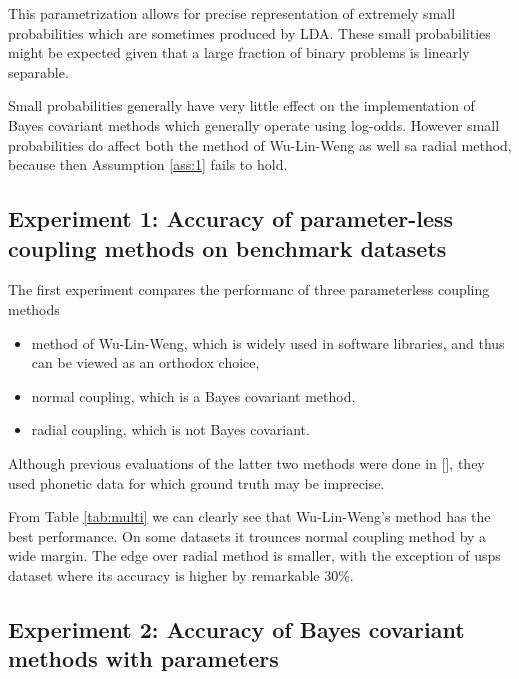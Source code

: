 \documentclass[twoside,11pt]{article}
\begin{document}
This parametrization allows for precise representation of extremely small probabilities which are sometimes produced by LDA. These small probabilities might be expected given that a large fraction of binary problems is linearly separable. 

Small probabilities generally have very little effect on the implementation of Bayes covariant methods which generally operate using log-odds. However small probabilities do affect both the method of Wu-Lin-Weng as well sa radial method, because then Assumption \ref{ass:1} fails to hold. 


\subsection{Experiment 1: Accuracy of parameter-less coupling methods on benchmark datasets} \label{sec:exp1}

The first experiment compares the performanc of three parameterless coupling methods
\begin{itemize}
\item method of Wu-Lin-Weng, which is widely used in software libraries, and thus can be viewed as an orthodox choice,
\item normal coupling, which is a Bayes covariant method,
\item radial coupling, which is not Bayes covariant.
\end{itemize}

Although previous evaluations of the latter two methods were done in [\cite{vsuch2016bayes}], they used phonetic data for which ground truth may be imprecise. 



From Table \ref{tab:multi} we can clearly see that Wu-Lin-Weng's method has the best performance. On some datasets it trounces normal coupling method by a wide margin. The edge over radial method is smaller, with the exception of usps dataset where its accuracy is higher by remarkable 30\%. 



\subsection{Experiment 2: Accuracy of Bayes covariant methods with parameters}
 \label{sec:exp2}
\end{document}
